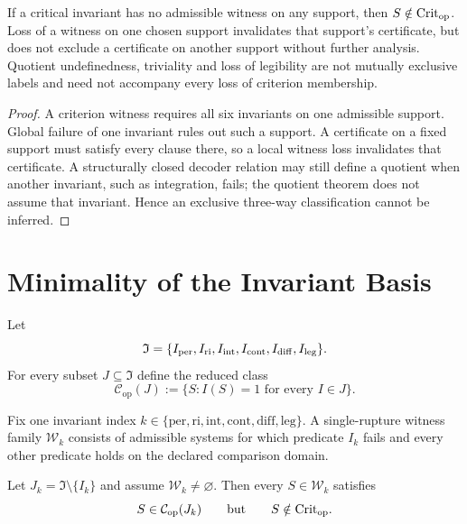 \begin{theorem}\label{thm:rupture}
If a critical invariant has no admissible witness on any support, then $S\notin\mathrm{Crit}_{\mathrm{op}}$. Loss of a witness on one chosen support invalidates that support's certificate, but does not exclude a certificate on another support without further analysis. Quotient undefinedness, triviality and loss of legibility are not mutually exclusive labels and need not accompany every loss of criterion membership.
\end{theorem}

\begin{proof}
A criterion witness requires all six invariants on one admissible support. Global failure of one invariant rules out such a support. A certificate on a fixed support must satisfy every clause there, so a local witness loss invalidates that certificate. A structurally closed decoder relation may still define a quotient when another invariant, such as integration, fails; the quotient theorem does not assume that invariant. Hence an exclusive three-way classification cannot be inferred.
\end{proof}

\section{Minimality of the Invariant Basis}

\begin{definition}
Let
\[
\mathfrak{I}=\{I_{\mathrm{per}},\allowbreak I_{\mathrm{ri}},\allowbreak I_{\mathrm{int}},\allowbreak I_{\mathrm{cont}},\allowbreak I_{\mathrm{diff}},\allowbreak I_{\mathrm{leg}}\}.
\]
For every subset $J\subseteq \mathfrak{I}$ define the reduced class
\[
\mathcal{C}_{\mathrm{op}}(J):=\{S:I(S)=1\text{ for every }I\in J\}.
\]
\end{definition}

\begin{definition}\leavevmode\par
Fix one invariant index $k\in\{\mathrm{per},\mathrm{ri},\mathrm{int},\mathrm{cont},\mathrm{diff},\mathrm{leg}\}$. A single-rupture witness family $\mathcal{W}_k$ consists of admissible systems for which predicate $I_k$ fails and every other predicate holds on the declared comparison domain.
\end{definition}

\begin{proposition}
Let $J_k=\mathfrak{I}\setminus\{I_k\}$ and assume $\mathcal{W}_k\neq \varnothing$. Then every $S\in \mathcal{W}_k$ satisfies
\[
S\in \mathcal{C}_{\mathrm{op}}(J_k)
\qquad\text{but}\qquad
S\notin \mathrm{Crit}_{\mathrm{op}}.
\]
\end{proposition}

